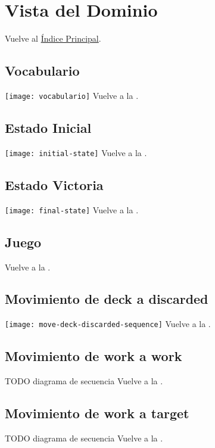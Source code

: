 \newpage{}
\section{Vista del Dominio}\label{domaintoc}

\secttoc
Vuelve al \hyperlink{toc}{Índice Principal}.

\newpage{}
\subsection{Vocabulario}
\texttt{[image: vocabulario]}
Vuelve a la .

\newpage{}
\subsection{Estado Inicial}
\texttt{[image: initial-state]}
Vuelve a la .

\newpage{}
\subsection{Estado Victoria}
\texttt{[image: final-state]}
Vuelve a la .

\begin{landscape}
\subsection{Juego}
\begin{center}
\end{center}
Vuelve a la .
\end{landscape}

\newpage{}
\subsection{Movimiento de deck a discarded}
\texttt{[image: move-deck-discarded-sequence]}
Vuelve a la .

\newpage{}
\subsection{Movimiento de work a work}
TODO diagrama de secuencia
Vuelve a la .

\newpage{}
\subsection{Movimiento de work a target}
TODO diagrama de secuencia
Vuelve a la .
